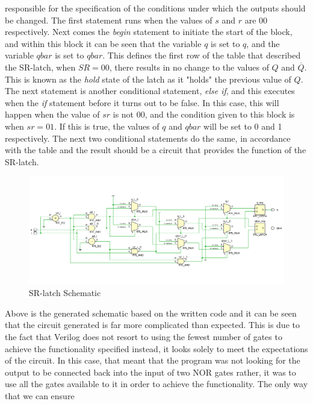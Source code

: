 \documentclass[12pt]{article}
\begin{document}
    responsible for the specification of the conditions under which the outputs
    should be changed. The first statement runs when the values of $s$ and $r$
    are 00 respectively. Next comes the \textit{begin} statement to initiate the
    start of the block, and within this block it can be seen that the variable
    $q$ is set to $q$, and the variable $qbar$ is set to $qbar$. This defines
    the first row of the table that described the SR-latch, when $S R = 00$,
    there results in no change to the values of $Q$ and $\overline{Q}$. This is
    known as the \textit{hold} state of the latch as it "holds" the previous
    value of $Q$. The next statement is another conditional statement,
    \textit{else if}, and this executes when the \textit{if} statement before it
    turns out to be false. In this case, this will happen when the value of $s
    r$ is not $00$, and the condition given to this block is when $s r = 01$. If
    this is true, the values of $q$ and $qbar$ will be set to 0 and 1
    respectively. The next two conditional statements do the same, in accordance
    with the table and the result should be a circuit that provides the function
    of the SR-latch.
    \begin{figure}[h]
        \centering
        \includegraphics[width=1.0\textwidth]{SRLatch Schematic.png}
        \caption{SR-latch Schematic}
    \end{figure}
    \par Above is the generated schematic based on the written code and it can
    be seen that the circuit generated is far more complicated than expected.
    This is due to the fact that Verilog does not resort to using the fewest
    number of gates to achieve the functionality specified instead, it looks
    solely to meet the expectations of the circuit. In this case, that meant
    that the program was not looking for the output to be connected back into
    the input of two NOR gates rather, it was to use all the gates available to
    it in order to achieve the functionality. The only way that we can ensure
\end{document}
